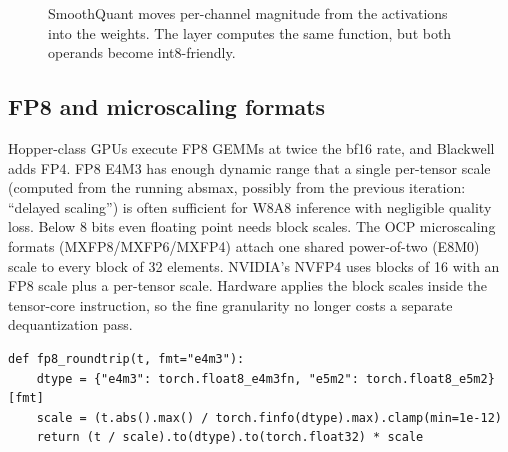 \begin{figure}[t]
\centering
{}
\caption{SmoothQuant moves per-channel magnitude from the activations into the weights.
The layer computes the same function, but both operands become int8-friendly.}
\label{fig:efficient:smooth}
\end{figure}

\subsection{FP8 and microscaling formats}
Hopper-class GPUs execute FP8 GEMMs at twice the bf16 rate, and Blackwell adds FP4.
FP8 E4M3 has enough dynamic range that a single per-tensor scale (computed from the
running absmax, possibly from the previous iteration: ``delayed scaling'') is often
sufficient for W8A8 inference with negligible quality loss. Below 8 bits even floating
point needs block scales. The OCP microscaling formats (MXFP8/MXFP6/MXFP4) attach one
shared power-of-two (E8M0) scale to every block of 32 elements. NVIDIA's NVFP4 uses
blocks of 16 with an FP8 scale plus a per-tensor scale. Hardware applies the block
scales inside the tensor-core instruction, so the fine granularity no longer costs a
separate dequantization pass.

\begin{lstlisting}[caption={Simulating FP8 storage with a per-tensor scale.},
label={lst:efficient:fp8}]
def fp8_roundtrip(t, fmt="e4m3"):
    dtype = {"e4m3": torch.float8_e4m3fn, "e5m2": torch.float8_e5m2}[fmt]
    scale = (t.abs().max() / torch.finfo(dtype).max).clamp(min=1e-12)
    return (t / scale).to(dtype).to(torch.float32) * scale
\end{lstlisting}

